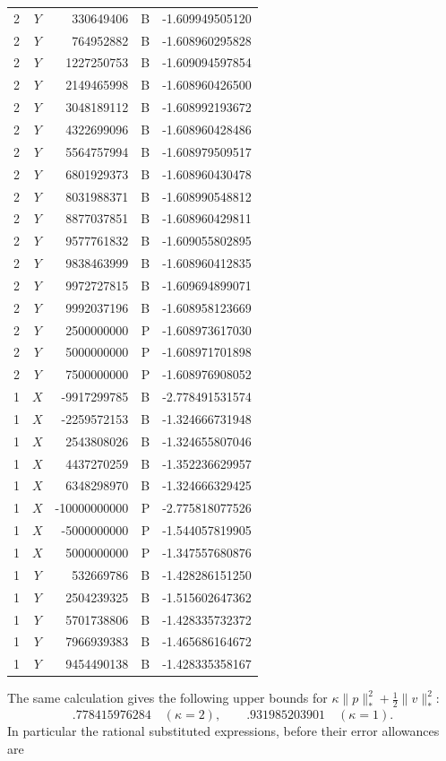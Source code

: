 \begin{longtable}{ccrrr}
2&$Y$&330649406&B&-1.609949505120\\
2&$Y$&764952882&B&-1.608960295828\\
2&$Y$&1227250753&B&-1.609094597854\\
2&$Y$&2149465998&B&-1.608960426500\\
2&$Y$&3048189112&B&-1.608992193672\\
2&$Y$&4322699096&B&-1.608960428486\\
2&$Y$&5564757994&B&-1.608979509517\\
2&$Y$&6801929373&B&-1.608960430478\\
2&$Y$&8031988371&B&-1.608990548812\\
2&$Y$&8877037851&B&-1.608960429811\\
2&$Y$&9577761832&B&-1.609055802895\\
2&$Y$&9838463999&B&-1.608960412835\\
2&$Y$&9972727815&B&-1.609694899071\\
2&$Y$&9992037196&B&-1.608958123669\\
2&$Y$&2500000000&P&-1.608973617030\\
2&$Y$&5000000000&P&-1.608971701898\\
2&$Y$&7500000000&P&-1.608976908052\\
1&$X$&-9917299785&B&-2.778491531574\\
1&$X$&-2259572153&B&-1.324666731948\\
1&$X$&2543808026&B&-1.324655807046\\
1&$X$&4437270259&B&-1.352236629957\\
1&$X$&6348298970&B&-1.324666329425\\
1&$X$&-10000000000&P&-2.775818077526\\
1&$X$&-5000000000&P&-1.544057819905\\
1&$X$&5000000000&P&-1.347557680876\\
1&$Y$&532669786&B&-1.428286151250\\
1&$Y$&2504239325&B&-1.515602647362\\
1&$Y$&5701738806&B&-1.428335732372\\
1&$Y$&7966939383&B&-1.465686164672\\
1&$Y$&9454490138&B&-1.428335358167\\
\end{longtable}
The same calculation gives the following upper bounds for
$\kappa\|p\|_*^2+\tfrac12\|v\|_*^2$:
\[
 .778415976284\quad(\kappa=2),\qquad
 .931985203901\quad(\kappa=1).
\]
In particular the
rational substituted expressions, before their error allowances are
